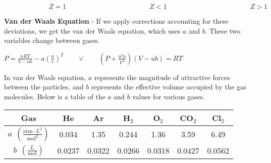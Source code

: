 \documentclass{article}
\begin{document}
\begin{qq}
\begin{center}
\begin{minipage}{\textwidth}
			\end{minipage}
		\end{center}
		$\qquad\qquad\qquad\:\: Z=1 \qquad\qquad\qquad\qquad\qquad\qquad   Z<1 \qquad\qquad\qquad\qquad\qquad\qquad Z>1$
	\end{qq}
	\vspace{10pt}
	\noindent\textbf{Van der Waals Equation} - If we apply corrections accounting for these deviations, we get the van der Waals equation, which uses $a$ and $b$. These two variables change between gases.
	\begin{qq}
		
		\begin{center}
			$P=\frac{nRT}{V-nb}-a\left(\frac{n}{v}\right)^2 \quad\quad \lor \qquad \left(P+\frac{u^2a}{V^2}\right)\left(V-ub\right)=RT$
		\end{center}
		
	\end{qq}
	
	\pagebreak
	
	
	
	\newcommand{\Tstrut}{\rule{0pt}{3.1ex}}         %
	\newcommand{\Bstrut}{\rule[-2ex]{0pt}{0pt}}   %
	\newcommand{\TBstrut}{\Tstrut\Bstrut}            %
	
	\noindent In van der Waals equation, $a$ represents the magnitude of attractive forces between the particles, and $b$ represents the effective volume occupied by the gas molecules. Below is a table of the $a$ and $b$ values for various gases.
		
		\begin{center}
			\begin{tabular}{ccccccc}
				\hline
				\textbf{Gas} & \textcolor{pag!40}{He} & \textcolor{pag!40}{Ar} & \textcolor{pag!40}{H$_2$} & \textcolor{pag!40}{O$_2$} & \textcolor{pag!40}{CO$_2$} & \textcolor{pag!40}{Cl$_2$} \\
				\hline
				$a\:\: \left(\frac{\text{atm}\cdot L^2}{\text{mol}^2}\right)$ & 0.034 & 1.35 & 0.244 & 1.36 & 3.59 & 6.49 \TBstrut \\
				$b\:\: \left(\frac{L}{\text{mol}}\right)$ & 0.0237 & 0.0322 & 0.0266 & 0.0318 & 0.0427 & 0.0562 \TBstrut\\
				\hline
			\end{tabular}
		\end{center}
		
\end{document}
